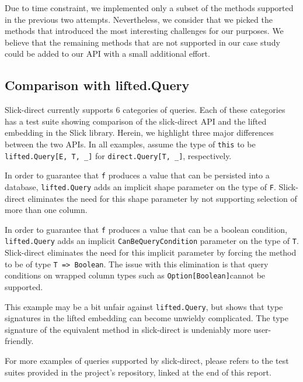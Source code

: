Due to time constraint, we implemented only a subset of the methods supported in the previous two attempts.
Nevertheless, we consider that we picked the methods that introduced the most interesting challenges for our purposes.
We believe that the remaining methods that are not supported in our case study could be added to our API with a small additional effort.

\subsection{Comparison with lifted.Query} %
\label{sub:Comparisonwithlifted.Query}
Slick-direct currently supports 6 categories of queries.
Each of these categories has a test suite showing comparison of the slick-direct API and the lifted embedding in the Slick library.
Herein, we highlight three major differences between the two APIs.
In all examples, assume the type of \texttt{this} to be \texttt{lifted.Query[E, T, \_]} for \texttt{direct.Query[T, \_]}, respectively.

In order to guarantee that \texttt{f} produces a value that can be persisted into a database, \texttt{lifted.Query} adds an implicit shape parameter on the type of \texttt{F}.
Slick-direct eliminates the need for this shape parameter by not supporting selection of more than one column.


In order to guarantee that \texttt{f} produces a value that can be a boolean condition, \texttt{lifted.Query} adds an implicit \texttt{CanBeQueryCondition} parameter on the type of \texttt{T}.
Slick-direct eliminates the need for this implicit parameter by forcing the method to be of type \texttt{T => Boolean}.
The issue with this elimination is that query conditions on wrapped column types such as \texttt{Option[Boolean]}cannot be supported.


This example may be a bit unfair against \texttt{lifted.Query}, but shows that type signatures in the lifted embedding can become unwieldy complicated.
The type signature of the equivalent method in slick-direct is undeniably more user-friendly.

For more examples of queries supported by slick-direct, please refers to the test suites provided in the project's repository, linked at the end of this report.




